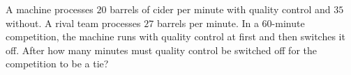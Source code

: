 A machine processes $20$ barrels of cider per minute with quality control and $35$ without. A rival team processes $27$ barrels per minute. In a $60$-minute competition, the machine runs with quality control at first and then switches it off. After how many minutes must quality control be switched off for the competition to be a tie?
